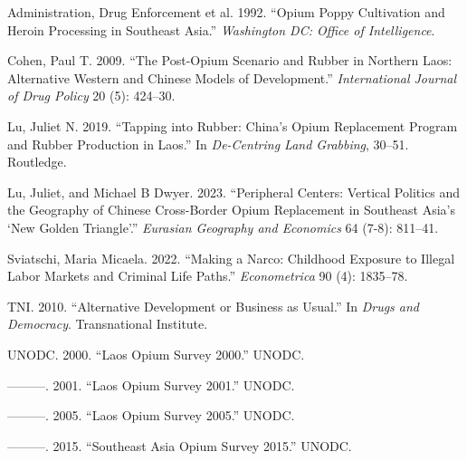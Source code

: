 \documentclass[
  letterpaper,
  DIV=11,
  numbers=noendperiod]{scrartcl}
\newlength{\cslhangindent}
\newenvironment{CSLReferences}[2] %
 {\begin{list}{}{%
  \setlength{\itemindent}{0pt}
  \setlength{\leftmargin}{0pt}
  \setlength{\parsep}{0pt}
  \ifodd #1
   \setlength{\leftmargin}{\cslhangindent}
   \setlength{\itemindent}{-1\cslhangindent}
  \fi
  \setlength{\itemsep}{#2\baselineskip}}}
 {\end{list}}
\begin{document}
\label{refs}
\begin{CSLReferences}{1}{0}
Administration, Drug Enforcement et al. 1992. {``Opium Poppy Cultivation
and Heroin Processing in Southeast Asia.''} \emph{Washington DC: Office
of Intelligence}.

Cohen, Paul T. 2009. {``The Post-Opium Scenario and Rubber in Northern
Laos: Alternative Western and Chinese Models of Development.''}
\emph{International Journal of Drug Policy} 20 (5): 424--30.

Lu, Juliet N. 2019. {``Tapping into Rubber: China's Opium Replacement
Program and Rubber Production in Laos.''} In \emph{De-Centring Land
Grabbing}, 30--51. Routledge.

Lu, Juliet, and Michael B Dwyer. 2023. {``Peripheral Centers: Vertical
Politics and the Geography of Chinese Cross-Border Opium Replacement in
Southeast Asia's {`New Golden Triangle'}.''} \emph{Eurasian Geography
and Economics} 64 (7-8): 811--41.

Sviatschi, Maria Micaela. 2022. {``Making a Narco: Childhood Exposure to
Illegal Labor Markets and Criminal Life Paths.''} \emph{Econometrica} 90
(4): 1835--78.

TNI. 2010. {``Alternative Development or Business as Usual.''} In
\emph{Drugs and Democracy}. Transnational Institute.

UNODC. 2000. {``Laos Opium Survey 2000.''} UNODC.

---------. 2001. {``Laos Opium Survey 2001.''} UNODC.

---------. 2005. {``Laos Opium Survey 2005.''} UNODC.

---------. 2015. {``Southeast Asia Opium Survey 2015.''} UNODC.

\end{CSLReferences}
\end{document}
